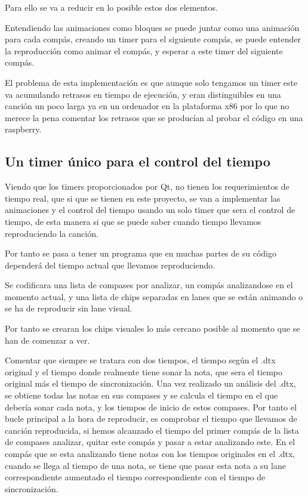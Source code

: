 \documentclass[a4paper,11pt,oneside]{book}
\begin{document}
Para ello se va a reducir en lo posible estos dos elementos.

Entendiendo las animaciones como bloques se puede juntar como una animación para cada compás, creando un timer para el siguiente compás, se puede entender la reproducción como animar el compás, y esperar a este timer del siguiente compás.

El problema de esta implementación es que aunque solo tengamos un timer este va acumulando retrasos en tiempo de ejecución, y eran distinguibles en una canción un poco larga ya en un ordenador en la plataforma x86 por lo que no merece la pena comentar los retrasos que se producían al probar el código en una raspberry.

\subsection{Un timer único para el control del tiempo}
Viendo que los timers proporcionados por Qt, no tienen los requerimientos de tiempo real, que si que se tienen en este proyecto, se van a implementar las animaciones y el control del tiempo usando un solo timer que sera el control de tiempo, de esta manera si que se puede saber cuando tiempo llevamos reproduciendo la canción.

Por tanto se pasa a tener un programa que en muchas partes de su código dependerá del tiempo actual que llevamos reproduciendo.

Se codificara una lista de compases por analizar, un compás analizandose en el momento actual, y una lista de chips separadas en lanes que se están animando o se ha de reproducir sin lane visual.

Por tanto se crearan los chips visuales lo más cercano posible al momento que se han de comenzar a ver.

Comentar que siempre se tratara con dos tiempos, el tiempo según el .dtx original y el tiempo donde realmente tiene sonar la nota, que sera el tiempo original más el tiempo de sincronización.
Una vez realizado un análisis del .dtx, se obtiene todas las notas en sus compases y se calcula el tiempo en el que debería sonar cada 
nota, y los tiempos de inicio de estos compases. 
Por tanto el bucle principal a la hora de reproducir, es comprobar el tiempo que llevamos de canción reproducida, si hemos alcanzado el tiempo del primer compás de la lista de compases analizar, quitar este compás y pasar a estar analizando este.
En el compás que se esta analizando tiene notas con los tiempos originales en el .dtx, cuando se llega al tiempo de una nota, se tiene que pasar esta nota a su lane correspondiente aumentado el tiempo correspondiente con el tiempo de sincronización.
 
\end{document}
